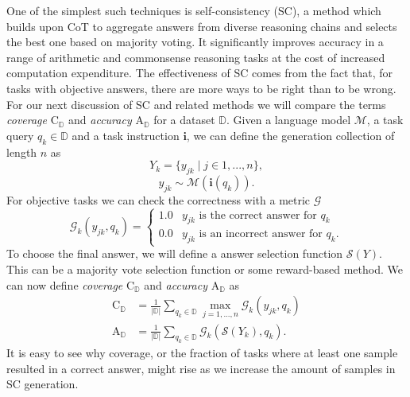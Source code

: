 One of the simplest such techniques is self-consistency\cite{wang2023selfconsistencyimproveschainthought} (SC),
a method which builds upon CoT to aggregate answers from diverse reasoning 
chains and selects the best one based on majority voting. 
It significantly improves accuracy in a range of arithmetic and commonsense reasoning tasks 
at the cost of increased computation expenditure\cite{wang2023selfconsistencyimproveschainthought}.
The effectiveness of SC comes from the fact that, for tasks with objective answers, there are more ways to be right than to be wrong.
For our next discussion of SC and related methods we will compare the 
terms \textit{coverage} $\mathrm{C}_{\mathbb{D}}$ and \textit{accuracy} $\mathrm{A}_{\mathbb{D}}$ for a dataset ${\mathbb{D}}$.
Given a language model $\mathcal{M}$, a task query $q_k \in {\mathbb{D}}$ and a task 
instruction $\mathbf{i}$, we can define the generation collection of length $n$ as
\begin{equation}
    Y_k = \{y_{jk}\mid j \in 1, ..., n\},
\end{equation}
\begin{equation}
    y_{jk} \sim \mathcal{M}(\mathbf{i}(q_k)).
\end{equation}
For objective tasks we can check the correctness with a metric $\mathcal{G}$
\begin{equation}
    \mathcal{G}_{k}(y_{jk}, q_k) = 
    \begin{cases}
        1.0 & y_{jk} \text{ is the correct answer for } q_k\\
        0.0 & y_{jk} \text{ is an incorrect answer for } q_k.
    \end{cases}
\end{equation}
To choose the final answer, we will define a answer selection function $\mathcal{S}(Y)$. 
This can be a majority vote selection function or some reward-based method.
We can now define \textit{coverage} $\mathrm{C}_{\mathbb{D}}$ and \textit{accuracy} $\mathrm{A}_{\mathbb{D}}$ as
\begin{align}
    \mathrm{C}_{\mathbb{D}} &= \frac{1}{|\mathbb{D}|} \sum_{q_k \in \mathbb{D}} \max_{j=1,...,n} \mathcal{G}_k(y_{jk}, q_k) \\
    \mathrm{A}_{\mathbb{D}} &= \frac{1}{|\mathbb{D}|} \sum_{q_k \in \mathbb{D}} \mathcal{G}_k\left( \mathcal{S}(Y_k), q_k \right).
\end{align}
It is easy to see why coverage, or the fraction of tasks where at least one sample resulted 
in a correct answer, might rise as we increase the amount of samples in SC generation. 

